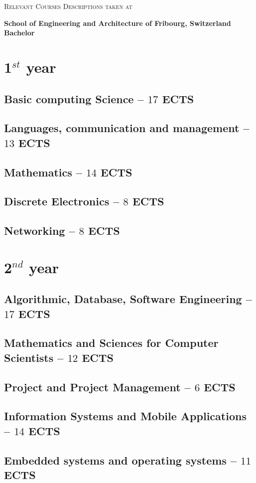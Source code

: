 \documentclass[11pt]{article}
\newcommand*{\heia}{School of Engineering and Architecture of Fribourg}
\newcommand{\module}[2]{
    \subsection{#1 \small -- $#2$ ECTS}
}
\begin{document}
\textsc{\LARGE Relevant Courses Descriptions taken at}%
\begin{center}
    \textbf{\heia{}, Switzerland\\Bachelor}
\end{center}


%
%
\section{1$^{st}$ year}
\module{Basic computing Science}{17}
\pagebreak
\pagebreak

\module{Languages, communication and management}{13}
\pagebreak

\module{Mathematics}{14}
\pagebreak
\pagebreak

\module{Discrete Electronics}{8}
\module{Networking}{8}


%
%
\pagebreak
\section{2$^{nd}$ year}
\module{Algorithmic, Database, Software Engineering}{17}
\pagebreak
\module{Mathematics and Sciences for Computer Scientists}{12}
\module{Project and Project Management}{6}
\module{Information Systems and Mobile Applications}{14}
\pagebreak
\module{Embedded systems and operating systems}{11}
\end{document}
